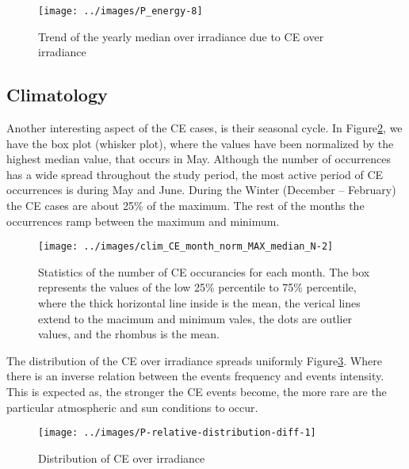 \documentclass[
]{article}
\begin{document}
\begin{figure}[h!]

{\centering \texttt{[image: ../images/P\_energy-8]} 

}

\caption{Trend of the yearly median over irradiance due to CE over irradiance}\label{fig:P-energy-median}
\end{figure}

\FloatBarrier

\hypertarget{climatology}{%
\subsection{Climatology}\label{climatology}}

Another interesting aspect of the CE cases, is their seasonal cycle. In
Figure\nobreakspace{}\ref{fig:relative-month-occurancies}, we have the box plot
(whisker plot), where the values have been normalized by the highest median value,
that occurs in May. Although the number of occurrences has a wide spread throughout
the study period, the most active period of CE occurrences is during May and June.
During the Winter (December -- February) the CE cases are about 25\% of the maximum.
The rest of the months the occurrences ramp between the maximum and minimum.

\begin{figure}[h!]

{\centering \texttt{[image: ../images/clim\_CE\_month\_norm\_MAX\_median\_N-2]} 

}

\caption{Statistics of the number of CE occurancies for each month. The box represents the values of the low 25\% percentile to 75\% percentile, where the thick horizontal line inside is the mean, the verical lines extend to the macimum and minimum vales, the dots are outlier values, and the rhombus is the mean.}\label{fig:relative-month-occurancies}
\end{figure}

The distribution of the CE over irradiance spreads uniformly
Figure\nobreakspace{}\ref{fig:ovir-distribution}. Where there is an inverse relation
between the events frequency and events intensity. This is expected as, the stronger
the CE events become, the more rare are the particular atmospheric and sun conditions
to occur.

\begin{figure}[h!]

{\centering \texttt{[image: ../images/P-relative-distribution-diff-1]} 

}

\caption{Distribution of CE over irradiance}\label{fig:ovir-distribution}
\end{figure}
\end{document}
